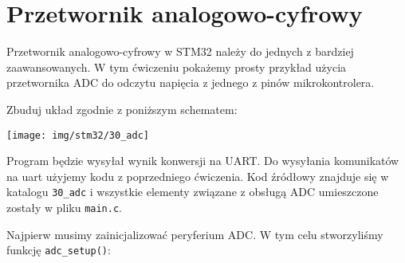 % 
% 
% 
% 

\section{Przetwornik analogowo-cyfrowy}
Przetwornik analogowo-cyfrowy w STM32 należy do jednych z bardziej zaawansowanych. W tym ćwiczeniu pokażemy prosty przykład
użycia przetwornika ADC do odczytu napięcia z jednego z pinów mikrokontrolera.

Zbuduj układ zgodnie z poniższym schematem:

\begin{center}\texttt{[image: img/stm32/30\_adc]}\end{center}

Program będzie wysyłał wynik konwersji na UART. Do wysyłania komunikatów na uart użyjemy kodu z poprzedniego ćwiczenia.
Kod źródłowy znajduje się w katalogu \Verb$30_adc$ i wszystkie elementy związane z obsługą ADC umieszczone zostały w pliku \Verb$main.c$.

Najpierw musimy zainicjalizować peryferium ADC. W tym celu stworzyliśmy funkcję \Verb$adc_setup()$:

\inputminted[frame=single,firstline=13,lastline=35]{c}{stm32-examples/30_adc/main.c} %

